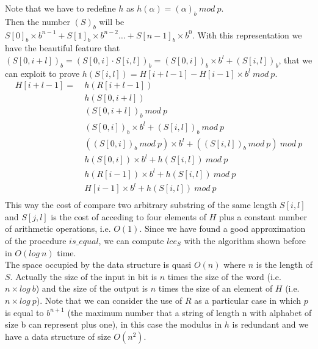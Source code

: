 \documentclass[a4paper]{article}
\begin{document}
Note that we have to redefine $h$ as $h(\alpha) = (\alpha)_b\ mod\ p$.\\
Then the number $(S)_b$ will be $S[0]_b \times b^{n - 1} + S[1]_b \times b^{n - 2} \dots + S[n-1]_b \times b^{0}$.
With this representation we have the beautiful feature that $(S[0, i+l])_b = (S[0,i] \cdot S[i,l])_b = (S[0,i])_b \times b^l + (S[i,l])_b$, that we can exploit to prove $h(S[i, l]) = H[i + l - 1] - H[i - 1] \times b^l \ mod\ p$.
\begin{align*}				
	     H[i+l-1] =\ & h(R[i+l-1]) \\
	 				& h(S[0, i+l]) \\
	 				& (S[0, i+l])_b\ mod\ p \\
        				& (S[0,i])_b \times b^l + (S[i,l])_b\ mod\ p \\
        				& ((S[0,i])_b\ mod\ p) \times b^l + ((S[i,l])_b\ mod\ p)\ mod\ p \\
        				& h(S[0,i]) \times b^l + h(S[i,l])\ mod\ p \\
        				& h(R[i-1]) \times b^l + h(S[i,l])\ mod\ p \\
        				& H[i-1] \times b^l + h(S[i,l])\ mod\ p \\
\end{align*}
This way the cost of compare two arbitrary substring of the same length $S[i,l]$ and $S[j,l]$ is the cost of acceding to four elements of $H$ plus a constant number of arithmetic operations, i.e. $O(1)$.
Since we have found a good approximation of the procedure $is\_equal$, we can compute $lce_S$ with the algorithm shown before in $O(log\ n)$ time.
\\
The space occupied by the data structure is quasi $O(n)$ where $n$ is the length of $S$. Actually the size of the input in bit is $n$ times the size of the word (i.e. $n \times log\ b$) and the size of the output is $n$ times the size of an element of $H$ (i.e. $n \times log\ p$). Note that we can consider the use of $R$ as a particular case in which $p$ is equal to $b^{n + 1}$ (the maximum number that a string of length n with alphabet of size b can represent plus one), in this case the modulus in $h$ is redundant and we have a data structure of size $O(n^2)$.\\
\end{document}
